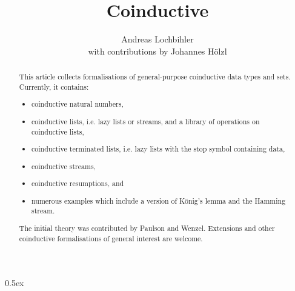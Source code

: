\documentclass[11pt,a4paper]{article}
\begin{document}
\title{Coinductive}
\author{Andreas Lochbihler \\ with contributions by Johannes H\"olzl}
\maketitle

\begin{abstract}
This article collects formalisations of general-purpose coinductive data
types and sets. Currently, it contains:
\begin{itemize}
\item coinductive natural numbers,
\item coinductive lists, i.e. lazy lists or streams, and a library of operations on coinductive lists,
\item coinductive terminated lists, i.e. lazy lists with the stop symbol containing data,
\item coinductive streams,
\item coinductive resumptions, and
\item numerous examples which include a version of K\"onig's lemma and the Hamming stream.
\end{itemize}

The initial theory was contributed by Paulson and Wenzel.  Extensions
and other coinductive formalisations of general interest are welcome.
\end{abstract}

\tableofcontents

\parindent 0pt\parskip 0.5ex

\pagebreak


\end{document}
